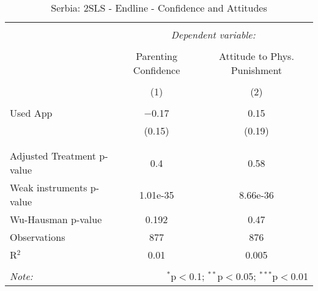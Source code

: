 
\begin{table}[!htbp] \centering 
  \caption{Serbia: 2SLS - Endline - Confidence and Attitudes} 
  \label{tbl:Serbia: 2SLS - Endline - Confidence and Attitudes} 
\begin{tabular}{@{\extracolsep{5pt}}lcc} 
\\[-1.8ex]\hline 
\hline \\[-1.8ex] 
 & \multicolumn{2}{c}{\textit{Dependent variable:}} \\ 
\cline{2-3} 
\\[-1.8ex] & Parenting Confidence & Attitude to Phys. Punishment \\ 
\\[-1.8ex] & (1) & (2)\\ 
\hline \\[-1.8ex] 
 Used App & $-$0.17 & 0.15 \\ 
  & (0.15) & (0.19) \\ 
  & & \\ 
\hline \\[-1.8ex] 
Adjusted Treatment p-value & 0.4 & 0.58 \\ 
Weak instruments p-value & 1.01e-35 & 8.66e-36 \\ 
Wu-Hausman p-value & 0.192 & 0.47 \\ 
Observations & 877 & 876 \\ 
R$^{2}$ & 0.01 & 0.005 \\ 
\hline 
\hline \\[-1.8ex] 
\textit{Note:}  & \multicolumn{2}{r}{$^{*}$p$<$0.1; $^{**}$p$<$0.05; $^{***}$p$<$0.01} \\ 
\end{tabular} 
\end{table} 
